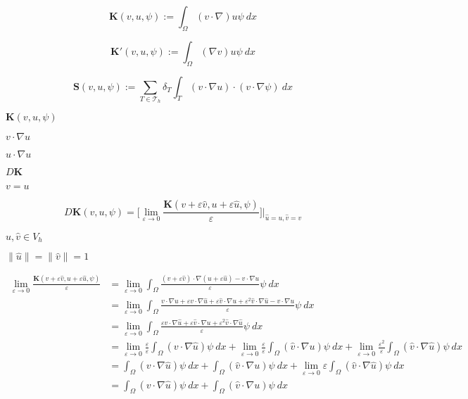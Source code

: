 \documentclass{article}
\begin{document}
\[\mathbf{K}(v,u,\psi) := \int_\Omega (v\cdot \nabla) u \psi~dx\]
\pagebreak

\[\mathbf{K'}(v,u,\psi) := \int_\Omega (\nabla v) u \psi~dx\]
\pagebreak

\[\mathbf{S}(v,u,\psi) := \sum_{T\in\mathcal{T}_h}\delta_{T}\int_T (v\cdot\nabla u)\cdot(v\cdot\nabla\psi)~dx\]
\pagebreak

$\mathbf{K}(v,u,\psi)$
\pagebreak

$v\cdot\nabla u$
\pagebreak

$u\cdot\nabla u$
\pagebreak

$D\mathbf{K}$
\pagebreak

$v=u$
\pagebreak

\[D\mathbf{K}(v,u,\psi) = \bigg[\lim_{\varepsilon\rightarrow 0} \frac{\mathbf{K}(v + \varepsilon \hat{v}, u+\varepsilon \hat{u}, \psi)}{\varepsilon}\bigg]\bigg|_{\hat{u}=u,\hat{v}=v}\]
\pagebreak

$\hat{u},\hat{v}\in V_h$
\pagebreak

$\|\hat{u}\| = \|\hat{v}\| = 1$
\pagebreak

\begin{align*}
\lim_{\varepsilon\rightarrow 0} \frac{\mathbf{K}(v + \varepsilon \hat{v}, u+\varepsilon \hat{u}, \psi)}{\varepsilon}
&=\lim_{\varepsilon\rightarrow 0} \int_\Omega \frac{(v + \varepsilon \hat{v})\cdot\nabla(u+\varepsilon \hat{u}) - v\cdot\nabla u}{\varepsilon}\psi~dx\\
&= \lim_{\varepsilon\rightarrow 0} \int_\Omega\frac{v\cdot\nabla u +\varepsilon v\cdot\nabla \hat{u} + \varepsilon \hat{v}\cdot\nabla u+\varepsilon^2 \hat{v}\cdot\nabla \hat{u} - v\cdot\nabla u}{\varepsilon}\psi~dx\\
&= \lim_{\varepsilon\rightarrow 0} \int_\Omega\frac{\varepsilon v\cdot\nabla \hat{u} + \varepsilon \hat{v}\cdot\nabla u+\varepsilon^2 \hat{v}\cdot\nabla \hat{u}}{\varepsilon}\psi~dx\\
&= \lim_{\varepsilon\rightarrow 0}\frac{\varepsilon}{\varepsilon}\int_\Omega (v\cdot\nabla \hat{u})\psi~dx + \lim_{\varepsilon\rightarrow 0}\frac{\varepsilon}{\varepsilon}\int_\Omega (\hat{v}\cdot\nabla u)\psi~dx + \lim_{\varepsilon\rightarrow 0} \frac{\varepsilon^2}{\varepsilon} \int_\Omega (\hat{v}\cdot\nabla \hat{u})\psi~dx\\
&= \int_\Omega (v\cdot\nabla \hat{u})\psi~dx + \int_\Omega (\hat{v}\cdot\nabla u)\psi~dx + \lim_{\varepsilon\rightarrow 0} \varepsilon \int_\Omega (\hat{v}\cdot\nabla \hat{u})\psi~dx\\
&= \int_\Omega (v\cdot\nabla \hat{u})\psi~dx + \int_\Omega (\hat{v}\cdot\nabla u)\psi~dx
\end{align*}
\pagebreak
\end{document}
